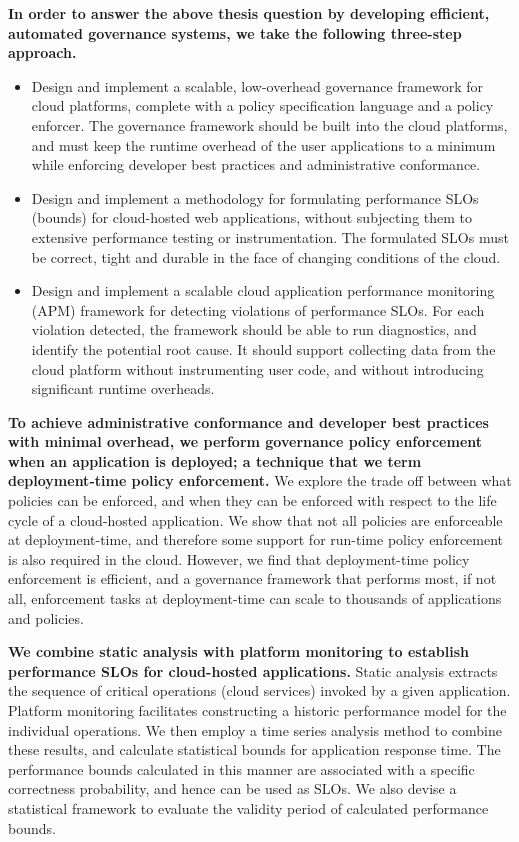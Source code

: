 \textbf{In order to answer the above thesis question by developing efficient, automated governance systems,
we take the following three-step approach.}
\begin{itemize}
\item Design and implement a scalable, low-overhead governance framework for cloud platforms,
complete with a policy specification language and a policy enforcer. The governance framework should be
built into the cloud platforms, and must
keep the runtime overhead of the user applications to a minimum while enforcing
developer best practices and administrative conformance.
\item Design and implement a methodology for formulating performance SLOs (bounds)
for cloud-hosted web applications, without
 subjecting them to extensive performance testing or instrumentation. The formulated
SLOs must be correct, tight and durable in the face of changing conditions of the cloud.
 \item Design and implement a scalable cloud application performance monitoring (APM) framework for detecting
violations of performance SLOs. For each
violation detected, the framework should be able to run diagnostics, and identify the potential
root cause. It should support collecting data from the cloud platform
 without instrumenting user code, and without introducing significant runtime overheads.
\end{itemize}

\textbf{To achieve administrative conformance and developer best practices with minimal overhead,
we perform governance policy enforcement when an application is deployed; a technique that we
term deployment-time policy enforcement.} 
We explore the
trade off between what policies can be enforced, and when they can be enforced with respect
to the life cycle of a cloud-hosted application. We show that not all policies
are enforceable at deployment-time, and therefore some support for run-time policy enforcement
is also required in the cloud. However, we find that
deployment-time policy enforcement is efficient, and a governance framework that
performs most, if not all, enforcement tasks at deployment-time can scale
to thousands of applications and policies.

\textbf{We combine static analysis with platform monitoring to establish performance SLOs for
cloud-hosted applications.} Static analysis
extracts the sequence of critical operations (cloud services) invoked by a given application.
Platform monitoring facilitates constructing a historic performance model for the individual operations.
We then employ a time series analysis method to combine these results, and calculate statistical bounds 
for application response time. The performance bounds calculated in this manner
are associated with a specific correctness probability, and hence can be used
as SLOs. We also devise a statistical framework to evaluate the validity period of 
calculated performance bounds.

